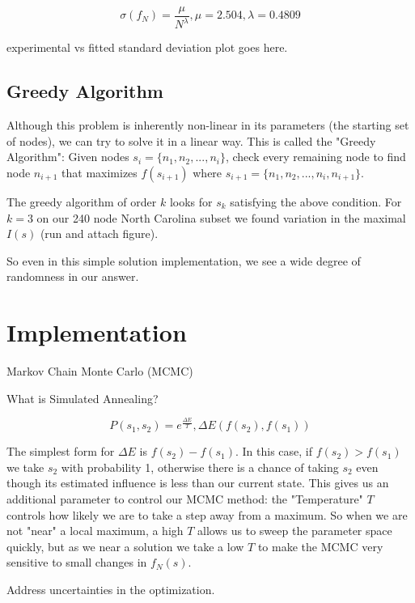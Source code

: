\documentclass{article}
\begin{document}
			\begin{equation}
			\boxed{
				\sigma(f_N) = \frac{\mu}{N^{\lambda}}, \mu =  2.504, \lambda = 0.4809
			}
			\end{equation}
			
	experimental vs fitted standard deviation plot goes here.
	
	\subsection{Greedy Algorithm}
		Although this problem is inherently non-linear in its parameters (the starting set of nodes), we can try to solve it in a linear way. This is called the "Greedy Algorithm":
		Given nodes $s_i = \{n_1, n_2,..., n_i\}$, check every remaining node to find node ${n_{i+1}}$ that maximizes $f(s_{i+1})$ where $s_{i+1} =  \{n_1, n_2, ..., n_i, n_{i+1}\}$.
		
		The greedy algorithm of order $k$ looks for $s_k$ satisfying the above condition. For $k = 3$ on our 240 node North Carolina subset we found variation in the maximal $I(s)$ (run and attach figure).
	
		So even in this simple solution implementation, we see a wide degree of randomness in our answer.	
		
	\section{Implementation}
		
	Markov Chain Monte Carlo (MCMC)
		
	What is Simulated Annealing?
		
		\begin{equation}
		\boxed{
			P(s_1,s_2) = e^\frac{\Delta E}{T}, \Delta E(f(s_2),f(s_1))
		}
		\end{equation}
		
		The simplest form for $\Delta E$ is $f(s_2) - f(s_1)$. In this case, if $f(s_2) > f(s_1)$ we take $s_2$ with probability 1, otherwise there is a chance of taking $s_2$ even though its estimated influence is less than our current state. This gives us an additional parameter to control our MCMC method: the "Temperature" $T$ controls how likely we are to take a step away from a maximum. So when we are not "near" a local maximum, a high $T$ allows us to sweep the parameter space quickly, but as we near a solution we take a low $T$ to make the MCMC very sensitive to small changes in $f_N(s)$.
	
	Address uncertainties in the optimization.
	
	
	
\end{document}
